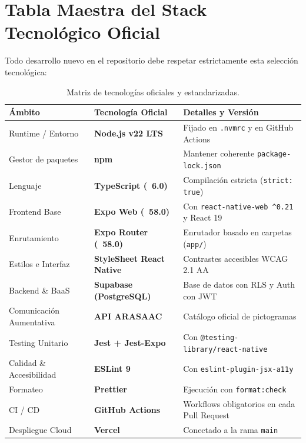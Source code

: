 \documentclass[11pt,a4paper]{article}
\begin{document}
\section{Tabla Maestra del Stack Tecnológico Oficial}

Todo desarrollo nuevo en el repositorio debe respetar estrictamente esta selección tecnológica:

\begin{table}[h!]
\centering
\small
\renewcommand{\arraystretch}{1.2}
\begin{tabularx}{\textwidth}{p{3.5cm} p{4.2cm} X}
\toprule
\textbf{Ámbito} & \textbf{Tecnología Oficial} & \textbf{Detalles y Versión} \\
\midrule
Runtime / Entorno & \textbf{Node.js v22 LTS} & Fijado en \texttt{.nvmrc} y en GitHub Actions \\
Gestor de paquetes & \textbf{npm} & Mantener coherente \texttt{package-lock.json} \\
Lenguaje & \textbf{TypeScript (~6.0)} & Compilación estricta (\texttt{strict: true}) \\
Frontend Base & \textbf{Expo Web (~58.0)} & Con \texttt{react-native-web \^{}0.21} y React 19 \\
Enrutamiento & \textbf{Expo Router (~58.0)} & Enrutador basado en carpetas (\texttt{app/}) \\
Estilos e Interfaz & \textbf{StyleSheet React Native} & Contrastes accesibles WCAG 2.1 AA \\
Backend \& BaaS & \textbf{Supabase (PostgreSQL)} & Base de datos con RLS y Auth con JWT \\
Comunicación Aumentativa & \textbf{API ARASAAC} & Catálogo oficial de pictogramas \\
Testing Unitario & \textbf{Jest + Jest-Expo} & Con \texttt{@testing-library/react-native} \\
Calidad \& Accesibilidad & \textbf{ESLint 9} & Con \texttt{eslint-plugin-jsx-a11y} \\
Formateo & \textbf{Prettier} & Ejecución con \texttt{format:check} \\
CI / CD & \textbf{GitHub Actions} & Workflows obligatorios en cada Pull Request \\
Despliegue Cloud & \textbf{Vercel} & Conectado a la rama \texttt{main} \\
\bottomrule
\end{tabularx}
\caption{Matriz de tecnologías oficiales y estandarizadas.}
\end{table}
\end{document}
